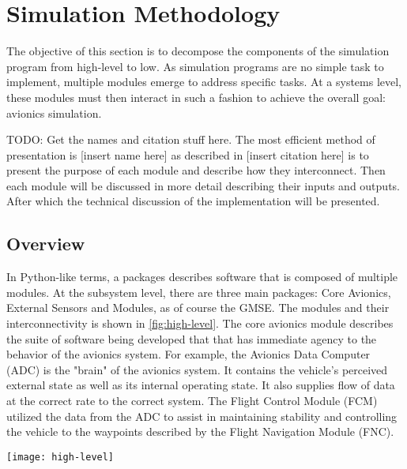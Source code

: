 \section{Simulation Methodology}
\label{sec:sim-method}

The objective of this section is to decompose the components of the simulation program from
high-level to low. As simulation programs are no simple task to implement, multiple modules emerge
to address specific tasks. At a systems level, these modules must then interact in such a fashion to
achieve the overall goal: avionics simulation.

TODO: Get the names and citation stuff here.
The most efficient method of presentation is [insert name here] as described in [insert citation
here] is to present the purpose of each module and describe how they interconnect. Then each module
will be discussed in more detail describing their inputs and outputs. After which the technical
discussion of the implementation will be presented.

\subsection{Overview}
In Python-like terms, a packages describes software that is composed of multiple modules. At the
subsystem level, there are three main packages: Core Avionics, External Sensors and Modules, as of
course the GMSE. The modules and their interconnectivity is shown in \autoref{fig:high-level}. The
core avionics module describes the suite of software being developed that that has immediate agency
to the behavior of the avionics system. For example, the Avionics Data Computer (ADC) is the "brain"
of the avionics system. It contains the vehicle's perceived external state as well as its internal
operating state. It also supplies flow of data at the correct rate to the correct system. The Flight
Control Module (FCM) utilized the data from the ADC to assist in maintaining stability and
controlling the vehicle to the waypoints described by the Flight Navigation Module (FNC).

\begin{figure*}
\texttt{[image: high-level]}
\caption{}
\label{fig:high-level}
\end{figure*}
